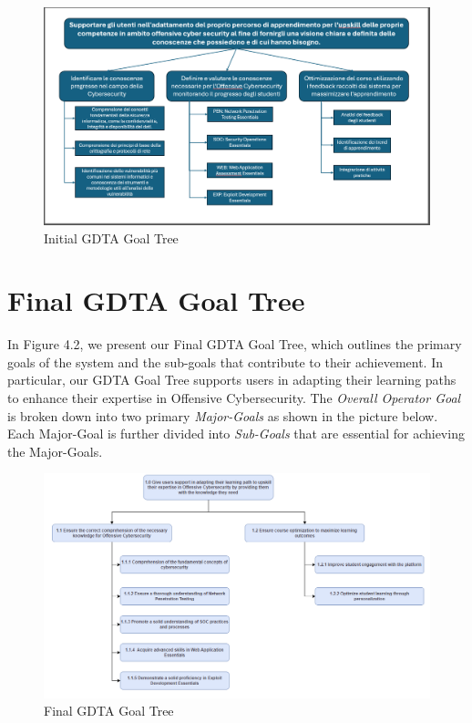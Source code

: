 \begin{figure}[H]
    \centering
    \includegraphics[width=\textwidth]{./assets/GDTA-vecchia.png}
    \caption{Initial GDTA Goal Tree}
    \label{fig:GDTA}
\end{figure}

\newpage
\section{Final GDTA Goal Tree}
In Figure 4.2, we present our Final GDTA Goal Tree, which outlines the primary goals of the system and the sub-goals that contribute to their achievement. In particular, our GDTA Goal Tree supports users in adapting their learning paths to enhance their expertise in Offensive Cybersecurity.
The \textit{Overall Operator Goal} is broken down into two primary \textit{Major-Goals} as shown in the picture below. Each Major-Goal is further divided into \textit{Sub-Goals} that are essential for achieving the Major-Goals. 

\begin{figure}[H]
    \centering
    \includegraphics[width=\textwidth]{./assets/GDTA.png}
    \caption{Final GDTA Goal Tree}
    \label{fig:GDTA}
\end{figure}

